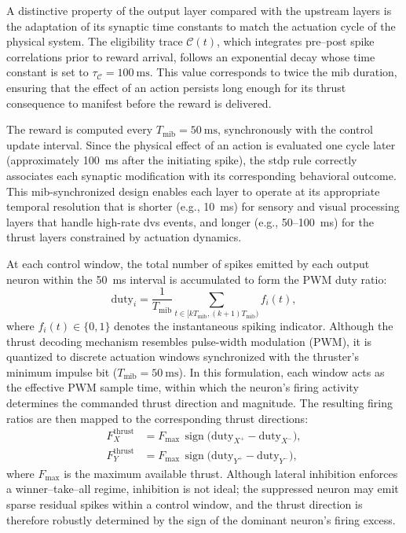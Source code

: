 A distinctive property of the output layer compared with the upstream layers is the adaptation of its synaptic time constants to match the actuation cycle of the physical system. The eligibility trace \(\mathcal{C}(t)\), which integrates pre–post spike correlations prior to reward arrival, follows an exponential decay whose time constant is set to \(\tau_{\mathcal{C}} = 100~\text{ms}\). This value corresponds to twice the \ac{mib} duration, ensuring that the effect of an action persists long enough for its thrust consequence to manifest before the reward is delivered.

The reward is computed every \(T_{\mathrm{mib}} = 50~\text{ms}\), synchronously with the control update interval. Since the physical effect of an action is evaluated one cycle later (approximately 100~ms after the initiating spike), the \ac{stdp} rule correctly associates each synaptic modification with its corresponding behavioral outcome. This \ac{mib}-synchronized design enables each layer to operate at its appropriate temporal resolution that is shorter (e.g., 10~ms) for sensory and visual processing layers that handle high-rate \ac{dvs} events, and longer (e.g., 50–100~ms) for the thrust layers constrained by actuation dynamics. 

At each control window, the total number of spikes emitted by each output neuron within the 50~ms interval is accumulated to form the PWM duty ratio:
\begin{equation}
\mathrm{duty}_i = \frac{1}{T_{\mathrm{mib}}}\sum_{t \in [kT_{\mathrm{mib}},(k+1)T_{\mathrm{mib}})} f_i(t),
\end{equation}
where \(f_i(t)\in\{0,1\}\) denotes the instantaneous spiking indicator. 
Although the thrust decoding mechanism resembles pulse-width modulation (PWM), it is quantized to discrete actuation windows synchronized with the thruster’s minimum impulse bit (\(T_{\mathrm{mib}}=50~\text{ms}\)). 
In this formulation, each window acts as the effective PWM sample time, within which the neuron’s firing activity determines the commanded thrust direction and magnitude. 
The resulting firing ratios are then mapped to the corresponding thrust directions:
\begin{align}
F_X^{\text{thrust}} &= F_{\max}\,\operatorname{sign}\!\big(\mathrm{duty}_{X^+}-\mathrm{duty}_{X^-}\big),\\
F_Y^{\text{thrust}} &= F_{\max}\,\operatorname{sign}\!\big(\mathrm{duty}_{Y^+}-\mathrm{duty}_{Y^-}\big),
\end{align}
where \(F_{\max}\) is the maximum available thrust. Although lateral inhibition enforces a winner–take–all regime, inhibition is not ideal; the suppressed neuron may emit sparse residual spikes within a control window, and the thrust direction is therefore robustly determined by the sign of the dominant neuron’s firing excess.

